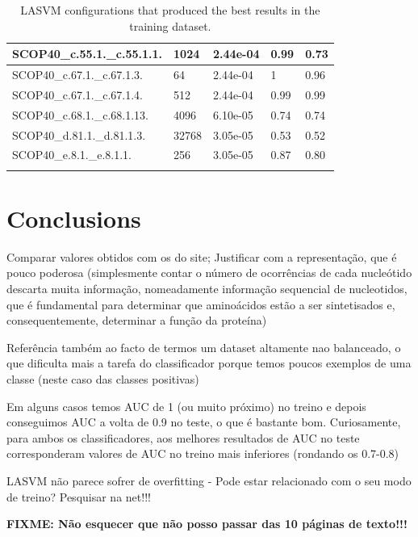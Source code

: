 \documentclass[11pt]{article}
\begin{document}
\begin{longtable}{|p{}|p{}|p{}|p{}|p{}|}
	SCOP40\_c.55.1.\_c.55.1.1.    & 1024    & 2.44e-04  & 0.99  & 0.73 \\ \hline
	
	SCOP40\_c.67.1.\_c.67.1.3.    & 64      & 2.44e-04  & 1     & 0.96 \\ \hline
	
	SCOP40\_c.67.1.\_c.67.1.4.    & 512     & 2.44e-04  & 0.99  & 0.99 \\ \hline
	
	SCOP40\_c.68.1.\_c.68.1.13.   & 4096    & 6.10e-05  & 0.74  & 0.74 \\ \hline
	
	SCOP40\_d.81.1.\_d.81.1.3.    & 32768   & 3.05e-05  & 0.53  & 0.52 \\ \hline
	
	SCOP40\_e.8.1.\_e.8.1.1.      & 256     & 3.05e-05  & 0.87  & 0.80  \\ \hline
	\caption{LASVM configurations that produced the best results in the training dataset.}
	\label{lasvm_results}
\end{longtable}

\section{Conclusions}
\label{conclusions}

Comparar valores obtidos com os do site; Justificar com a representação, que é pouco poderosa (simplesmente contar o número de ocorrências de cada nucleótido descarta muita informação, nomeadamente informação sequencial de nucleotidos, que é fundamental para determinar que aminoácidos estão a ser sintetisados e, consequentemente, determinar a função da proteína)

Referência também ao facto de termos um dataset altamente nao balanceado, o que dificulta mais a tarefa do classificador porque temos poucos exemplos de uma classe (neste caso das classes positivas)

Em alguns casos temos AUC de 1 (ou muito próximo) no treino e depois conseguimos AUC a volta de 0.9 no teste, o que é bastante bom. Curiosamente, para ambos os classificadores, aos melhores resultados de AUC no teste corresponderam valores de AUC no treino mais inferiores (rondando os 0.7-0.8)

LASVM não parece sofrer de overfitting - Pode estar relacionado com o seu modo de treino? Pesquisar na net!!!

\textbf{FIXME: Não esquecer que não posso passar das 10 páginas de texto!!!}



\end{document}

